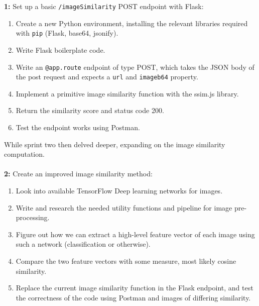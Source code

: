 \documentclass[12pt,a4paper]{article}
\begin{document}
\textbf{1:} Set up a basic \verb|/imageSimilarity| POST endpoint with Flask:
\begin{enumerate}
    \item Create a new Python environment, installing the relevant libraries required with \verb|pip| (Flask, base64, jsonify).
    \item Write Flask boilerplate code.
    \item Write an \verb|@app.route| endpoint of type POST, which takes the JSON body of the post request and expects a \verb|url| and \verb|imageb64| property.
    \item Implement a primitive image similarity function with the ssim.js library.
    \item Return the similarity score and status code 200.
    \item Test the endpoint works using Postman.
\end{enumerate}
While sprint two then delved deeper, expanding on the image similarity computation.
\\\\
\textbf{2:} Create an improved image similarity method:
\begin{enumerate}
    \item Look into available TensorFlow Deep learning networks for images.
    \item Write and research the needed utility functions and pipeline for image pre-processing.
    \item Figure out how we can extract a high-level feature vector of each image using such a network (classification or otherwise).
    \item Compare the two feature vectors with some measure, most likely cosine similarity.
    \item Replace the current image similarity function in the Flask endpoint, and test the correctness of the code using Postman and images of differing similarity.
\end{enumerate}
\end{document}

